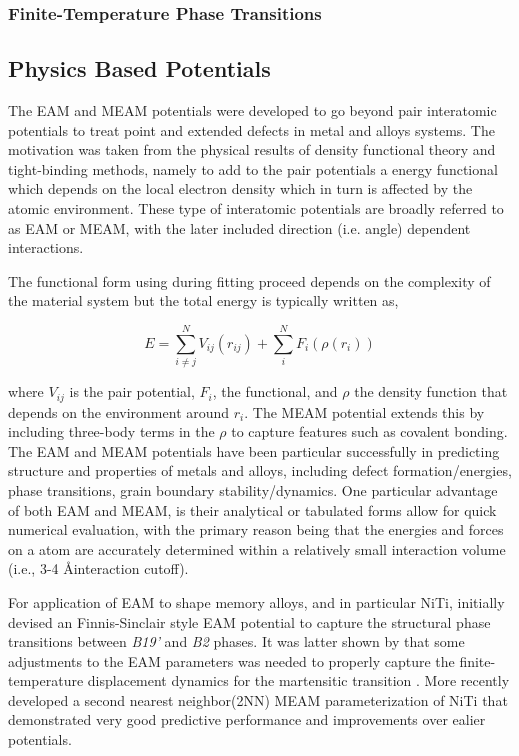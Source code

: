 \documentclass[preprint,colorlinks=true,linkcolor=black,citecolor=black]{elsarticle}
\begin{document}
\subsubsection{Finite-Temperature Phase Transitions}

\subsection{Physics Based Potentials}
\label{sec:physics_potentials}

The EAM and MEAM potentials were developed to go beyond pair interatomic potentials to treat point and extended defects in metal and alloys systems. The motivation was taken from the physical results of  density functional theory and tight-binding methods, namely to add to the pair potentials a energy functional which depends on the local electron density which in turn is affected by the atomic environment. These type of interatomic potentials are broadly referred to as EAM or MEAM, with the later included direction (i.e. angle) dependent interactions. \par

The functional form using during fitting proceed depends on the complexity of the material system but the total energy is typically written as,

\begin{equation}
  \label{eq:eam}
  E = \sum_{i\neq j}^N V_{ij}(r_{ij}) + \sum_i^N F_i\left(\rho(r_i)\right)
\end{equation}

where $V_{ij}$ is the pair potential, $F_i$, the functional, and $\rho$ the density function that depends on the environment around $r_i$. The MEAM potential extends this by including three-body terms in the $\rho$ to capture features such as covalent bonding. The EAM and MEAM potentials have been particular successfully in predicting structure and properties of metals and alloys, including defect formation/energies, phase transitions, grain boundary stability/dynamics. One particular advantage of both EAM and MEAM, is their analytical or tabulated forms allow for quick numerical evaluation, with the primary reason being that the energies and forces on a atom are accurately determined within a relatively small interaction volume (i.e., 3-4 \AA interaction cutoff).  \par

For application of EAM to shape memory alloys, and in particular NiTi, \citet{Mutter2010} initially devised an Finnis-Sinclair style EAM potential to capture the structural phase transitions between \textit{B19'} and \textit{B2} phases. It was latter shown by \cite{Zhong2011} that some adjustments to the EAM parameters was needed to properly capture the finite-temperature displacement dynamics for the martensitic transition \cite{Gur2017}. More recently \citet{Ko2015} developed a second nearest neighbor(2NN) MEAM parameterization of NiTi that demonstrated very good predictive performance and improvements over ealier potentials.   
\end{document}
